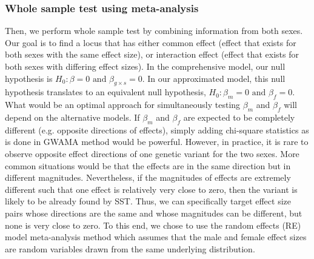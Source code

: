 \documentclass[11pt]{article}
\begin{document}
\subsubsection*{Whole sample test using meta-analysis}
\label{meta_sex}
Then, we perform whole sample test by combining information from both sexes. 
Our goal is to find a locus that has either common effect (effect that exists for both sexes with the same effect size), or 
interaction effect (effect that exists for both sexes with differing effect sizes). 
In the comprehensive model, our null hypothesis is $H_0:\beta=0\mbox{ and }\beta_{g\times s}=0$.
In our approximated model, this null hypothesis translates to an equivalent null hypothesis, $H_0:\beta_m=0\mbox{ and }\beta_f=0$.
What would be an optimal approach for simultaneously testing $\beta_m$ and $\beta_f$ will depend on the alternative models.
If $\beta_m$ and $\beta_f$ are expected to be completely different
(e.g. opposite directions of effects),
simply adding chi-square statistics as is done in GWAMA method \citep{Magi:GenetEpidemiol:2010} would be powerful. 
However, in practice, it is rare to observe opposite effect directions of one genetic variant for the two sexes.
More common situations would be that the effects are in the same direction but in different magnitudes.
Nevertheless, if the magnitudes of effects are extremely different such that one effect is relatively very close to zero, then the variant is likely to be already found by SST.
Thus, we can specifically target effect size pairs whose directions are the same and whose magnitudes can be different, but none is very close to zero. 
To this end, we chose to use the random effects (RE) model meta-analysis method which assumes that the male and female effect sizes are random variables drawn from the same underlying distribution.
\end{document}
